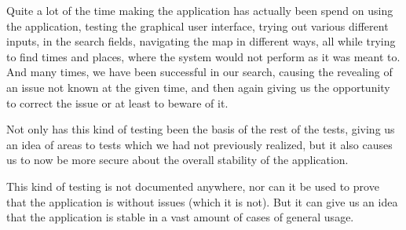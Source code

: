 Quite a lot of the time making the application has actually been spend on using the application, testing the graphical user interface, trying out various different inputs, in the search fields, navigating the map in different ways, all while trying to find times and places, where the system would not perform as it was meant to. And many times, we have been successful in our search, causing the revealing of an issue not known at the given time, and then again giving us the opportunity to correct the issue or at least to beware of it.

Not only has this kind of testing been the basis of the rest of the tests, giving us an idea of areas to tests which we had not previously realized, but it also causes us to now be more secure about the overall stability of the application.

This kind of testing is not documented anywhere, nor can it be used to prove that the application is without issues (which it is not). But it can give us an idea that the application is stable in a vast amount of cases of general usage.